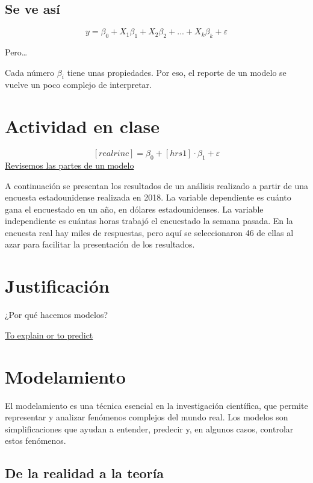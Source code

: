 \documentclass[
  letterpaper,
  DIV=11,
  numbers=noendperiod]{scrreprt}
\begin{document}
\subsection{Se ve así}\label{se-ve-asuxed}

\[
y = \beta_0 +  X_1 \beta_1 + X_2 \beta_2 + ... + X_k\beta_k + \varepsilon
\]

Pero\ldots{}

Cada número \(\beta_i\) tiene unas propiedades. Por eso, el reporte de
un modelo se vuelve un poco complejo de interpretar.

\section{Actividad en clase}\label{actividad-en-clase}

\[
[realrinc] = \beta_0 +  [hrs1] \cdot \beta_1 + \varepsilon
\] \href{https://www.stathelp.se/en/regoutput_en.html}{Revisemos las
partes de un modelo}

A continuación se presentan los resultados de un análisis realizado a
partir de una encuesta estadounidense realizada en 2018. La variable
dependiente es cuánto gana el encuestado en un año, en dólares
estadounidenses. La variable independiente es cuántas horas trabajó el
encuestado la semana pasada. En la encuesta real hay miles de
respuestas, pero aquí se seleccionaron 46 de ellas al azar para
facilitar la presentación de los resultados.

\section{Justificación}\label{justificaciuxf3n-1}

¿Por qué hacemos modelos?

\href{https://www.stat.berkeley.edu/~aldous/157/Papers/shmueli.pdf}{To
explain or to predict}

\section{Modelamiento}\label{modelamiento-1}

El modelamiento es una técnica esencial en la investigación científica,
que permite representar y analizar fenómenos complejos del mundo real.
Los modelos son simplificaciones que ayudan a entender, predecir y, en
algunos casos, controlar estos fenómenos.

\subsection{De la realidad a la
teoría}\label{de-la-realidad-a-la-teoruxeda}
\end{document}
